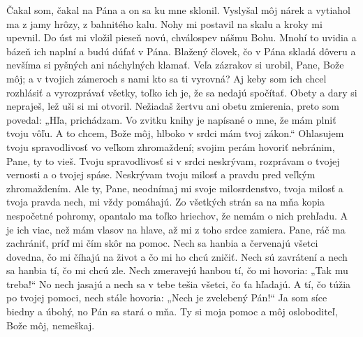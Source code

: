 Čakal som, čakal na Pána
a on sa ku mne sklonil.
\versseparator
Vyslyšal môj nárek
a vytiahol ma z jamy hrôzy, z bahnitého kalu.
\versseparator
Nohy mi postavil na skalu
a kroky mi upevnil.
\versseparator
Do úst mi vložil pieseň novú,
chválospev nášmu Bohu.
\versseparator
Mnohí to uvidia a bázeň ich naplní
a budú dúfať v Pána.
\versseparator
Blažený človek, čo v Pána skladá dôveru
a nevšíma si pyšných ani náchylných klamať.
\versseparator
Veľa zázrakov si urobil, Pane, Bože môj;
a v tvojich zámeroch s nami kto sa ti vyrovná?
\versseparator
Aj keby som ich chcel rozhlásiť a vyrozprávať všetky,
toľko ich je, že sa nedajú spočítať.
\versseparator
Obety a dary si nepraješ,
lež uši si mi otvoril.
\versseparator
Nežiadaš žertvu ani obetu zmierenia,
preto som povedal: „Hľa, prichádzam.
\versseparator
Vo zvitku knihy je napísané o mne,
že mám plniť tvoju vôľu.
\versseparator
A to chcem, Bože môj,
hlboko v srdci mám tvoj zákon.“
\versseparator
Ohlasujem tvoju spravodlivosť vo veľkom zhromaždení;
svojim perám hovoriť nebránim, Pane, ty to vieš.
\versseparator
Tvoju spravodlivosť si v srdci neskrývam,
rozprávam o tvojej vernosti a o tvojej spáse.
\versseparator
Neskrývam tvoju milosť
a pravdu pred veľkým zhromaždením.
\versseparator
Ale ty, Pane, neodnímaj mi svoje milosrdenstvo,
tvoja milosť a tvoja pravda nech, mi vždy pomáhajú.
\versseparator
Zo všetkých strán sa na mňa kopia
nespočetné pohromy,
\versseparator
opantalo ma toľko hriechov,
že nemám o nich prehľadu.
\versseparator
A je ich viac, než mám vlasov na hlave,
až mi z toho srdce zamiera.
\versseparator
Pane, ráč ma zachrániť,
príď mi čím skôr na pomoc.
\versseparator
Nech sa hanbia a červenajú všetci dovedna,
čo mi číhajú na život a čo mi ho chcú zničiť.
\versseparator
Nech sú zavrátení a nech sa hanbia tí,
čo mi chcú zle.
\versseparator
Nech zmeravejú hanbou tí,
čo mi hovoria: „Tak mu treba!“
\versseparator
No nech jasajú a nech sa v tebe tešia všetci, čo ťa hľadajú.
A tí, čo túžia po tvojej pomoci,
nech stále hovoria: „Nech je zvelebený Pán!“
\versseparator
Ja som síce biedny a úbohý,
no Pán sa stará o mňa.
\versseparator
Ty si moja pomoc a môj osloboditeľ,
Bože môj, nemeškaj.